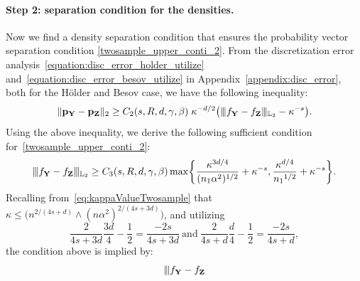 \documentclass[twoside,11pt]{article}
\newcommand\numberthis{\addtocounter{equation}{1}\tag{\theequation}}
\newcommand{\Ell}{\mathbb{L}}
\newcommand{\EllTwo}{\Ell_2} %
\newcommand{\rvTwo}{Y}
\newcommand{\rvThree}{Z}
\newcommand{\vectorize}[1]{\mathbf{#1}}
\newcommand{\dimDensity}{d} %
\newcommand{\sampleSize}{n}
\newcommand{\probVec}{\mathbf{p}} %
\newcommand{\smoothness}{s}
\newcommand{\ballRadius}{R}
\newcommand{\privacyParameter}{\alpha} %
\newcommand{\maxErrorTypeTwo}{\beta} %
\newcommand{\maxErrorTypeOne}{\gamma} %
\newcommand{\binNum}{\kappa}           %
\begin{document}
\begin{appendix}
	\paragraph{Step 2: separation condition for the densities.}
	Now we find a density separation condition  that ensures the probability vector separation condition \eqref{twosample_upper_conti_2}. 
	From the discretization error analysis~\eqref{equation:disc_error_holder_utilize} and~\eqref{equation:disc_error_besov_utilize} in Appendix~\ref{appendix:disc_error}, both for the H\"{o}lder and Besov case, we have the following inequality:
	\begin{equation*}
		\|\probVec_{\vectorize{\rvTwo}}- \probVec_{\vectorize{\rvThree}}\|_2
		\geq
		C_2(\smoothness, \ballRadius, \dimDensity, \maxErrorTypeOne, \maxErrorTypeTwo)
		\;
		\binNum^{-\dimDensity/2}
		\bigl(
		\vert\kern-0.25ex
		\vert\kern-0.25ex
		\vert
		f_{\vectorize{Y}} - f_{\vectorize{Z}}
		\vert\kern-0.25ex
		\vert\kern-0.25ex
		\vert_{\EllTwo}
		-
		\binNum^{-\smoothness}
		\bigr).
	\end{equation*}
	Using the above inequality,  we derive the following sufficient condition for~\eqref{twosample_upper_conti_2}:
	\begin{align*}
		\vert\kern-0.25ex
		\vert\kern-0.25ex
		\vert
		f_{\vectorize{Y}} - f_{\vectorize{Z}}
		\vert\kern-0.25ex
		\vert\kern-0.25ex
		\vert_{\EllTwo}
		\geq
		C_3 (\smoothness, \ballRadius, \dimDensity, \maxErrorTypeOne, \maxErrorTypeTwo)
		\max
		\biggl\{
		\frac
		{\binNum^{3\dimDensity/4}}
		{(\sampleSize_1 \privacyParameter^2)^{1/2}} + \binNum^{-\smoothness}
		,
		\frac
		{\binNum^{\dimDensity/4}}
		{{\sampleSize_1}^{1/2}} + \binNum^{-\smoothness}
		\biggr\}.
	\end{align*}
	Recalling from~\eqref{eq:kappaValueTwosample} that $\binNum \leq \bigl( n^{2/(4\smoothness+\dimDensity)}\wedge (n \privacyParameter^2)^{2/(4\smoothness+3\dimDensity)} \bigr)$, 
	and utilizing
	\begin{equation*}
		\frac{2}{4\smoothness+3\dimDensity}
		\frac{3\dimDensity}{4}
		- 
		\frac{1}{2}
		= 
		\frac{-2\smoothness}{4\smoothness+3\dimDensity}
		~\text{and}~
		\frac{2}{4\smoothness+\dimDensity}
		\frac{d}{4} 
		-
		\frac{1}{2}
		= 
		\frac{-2\smoothness}{4\smoothness+\dimDensity},
	\end{equation*}
	the condition above is implied by:
	\begin{equation*}
		\vert\kern-0.25ex
		\vert\kern-0.25ex
		\vert
		f_{\vectorize{Y}} - f_{\vectorize{Z}}

\end{equation*}
\end{appendix}
\end{document}
